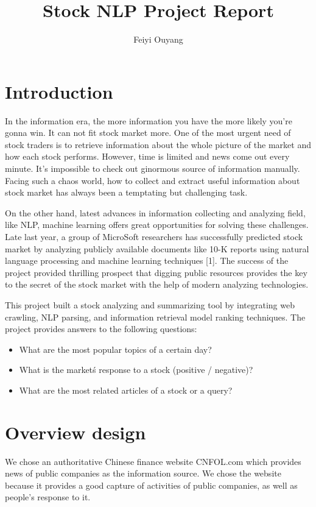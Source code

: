 \documentclass{article}
\begin{document}
\title{Stock NLP Project Report}
\author{Feiyi Ouyang}
\date{}
\maketitle
\section{Introduction}
In the information era, the more information you have the more likely you're gonna win. It can not fit stock market more. One of the most urgent need of stock traders is to retrieve information about the whole picture of the market and how each stock performs. However, time is limited and news come out every minute. It's impossible to check out ginormous source of information manually. Facing such a chaos world, how to collect and extract useful information about stock market has always been a temptating but challenging task. 

On the other hand, latest advances in information collecting and analyzing field, like NLP, machine learning offers great opportunities for solving these challenges. Late last year, a group of MicroSoft researchers has successfully predicted stock market by analyzing publicly available documents like 10-K reports using natural language processing and machine learning techniques [1]. The success of the project provided thrilling prospect that digging public resources provides the key to the secret of the stock market with the help of modern analyzing technologies. 

This project built a stock analyzing and summarizing tool by integrating web crawling, NLP parsing, and information retrieval model ranking techniques. The project provides answers to the following questions: 

\begin{itemize}
  \item What are the most popular topics of a certain day?
  \item What is the market\'s response to a stock (positive / negative)?
  \item What are the most related articles of a stock or a query?
\end{itemize}

\section{Overview design}
We chose an authoritative Chinese finance website CNFOL.com which provides news of public companies as the information source. We chose the website because it provides a good capture of activities of public companies, as well as people's response to it.
\end{document}
